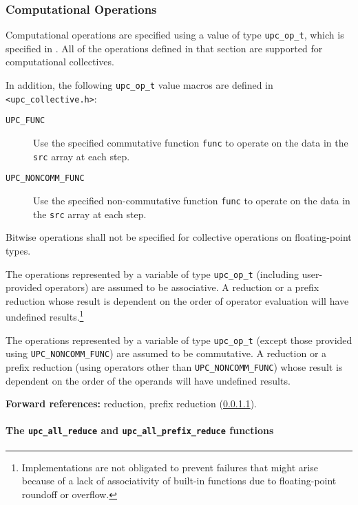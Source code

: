 \subsubsection{Computational Operations}
\label{upc-op-t-section}

\npf Computational operations are specified using a value of type
{\tt upc\_op\_t}, which is specified in \upcopsection. All of the 
operations defined in that section are supported for computational collectives.

In addition, the following {\tt upc\_op\_t} value macros 
are defined in {\tt <upc\_collective.h>}:
\begin{description}
\item[{\tt UPC\_FUNC}]
Use the specified commutative function {\tt func} to operate
on the data in the {\tt src} array at each step.
\item[{\tt UPC\_NONCOMM\_FUNC}]
Use the specified non-commutative function {\tt func} to
operate on the data in the {\tt src} array at each step.
\end{description}

\np Bitwise operations shall not be specified for collective 
    operations on floating-point types.

\np The operations represented by a variable of type {\tt upc\_op\_t}
(including user-provided operators) are assumed to be associative.
A reduction or a prefix reduction whose result is dependent on the
order of operator evaluation will have undefined results.\footnote{
Implementations are not obligated to prevent failures that
might arise because of a lack of associativity of built-in functions
due to floating-point roundoff or overflow.}

\np The operations represented by a variable of type {\tt upc\_op\_t}
(except those provided using {\tt UPC\_NONCOMM\_FUNC}) are assumed
to be commutative.  A reduction or a prefix reduction (using operators
other than {\tt UPC\_NONCOMM\_FUNC}) whose result is dependent on
the order of the operands will have undefined results.

{\bf Forward references:} reduction, prefix reduction (\ref{reduction}).

\paragraph{The {\tt upc\_all\_reduce} and {\tt upc\_all\_prefix\_reduce} functions}
\label{reduction}

